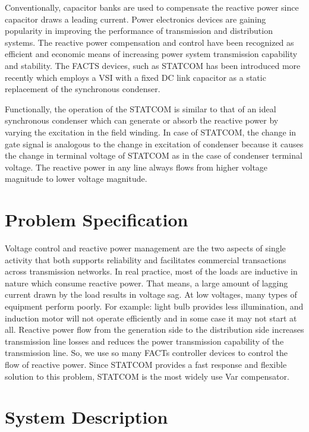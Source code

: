 \documentclass[journal,twoside]{IEEEtran}
\begin{document}
Conventionally, capacitor banks are used to
compensate the reactive power since capacitor
draws a leading current. Power electronics
devices are gaining popularity in improving the
performance of transmission and distribution
systems. The reactive power compensation and
control have been recognized as efficient and
economic means of increasing power system
transmission capability and stability. The FACTS
devices, such as STATCOM has been introduced
more recently which employs a VSI with a fixed
DC link capacitor as a static replacement of the
synchronous condenser.

\bigskip
Functionally, the operation of the STATCOM is
similar to that of an ideal synchronous
condenser which can generate or absorb the
reactive power by varying the excitation in the
field winding. In case of STATCOM, the change in
gate signal is analogous to the change in
excitation of condenser because it causes the
change in terminal voltage of STATCOM as in the
case of condenser terminal voltage. The reactive
power in any line always flows from higher
voltage magnitude to lower voltage magnitude.
	

\section{Problem Specification}

Voltage
control
and
reactive
power
management are the two aspects of single
activity that both supports reliability and
facilitates commercial transactions across
transmission networks. In real practice, most of
the loads are inductive in nature which consume
reactive power. That means, a large amount of
lagging current drawn by the load results in
voltage sag. At low voltages, many types of
equipment perform poorly. For example: light bulb provides less illumination, and induction
motor will not operate efficiently and in some
case it may not start at all. Reactive power flow
from the generation side to the distribution side
increases transmission line losses and reduces
the power transmission capability of the transmission line. So, we use so many FACTs
controller devices to control the flow of reactive
power. Since STATCOM provides a fast response
and flexible solution to this problem, STATCOM
is the most widely use Var compensator. 



	\section{System Description}
\end{document}
